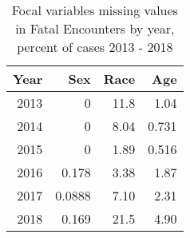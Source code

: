 \begin{table}[ht]
\centering
\begin{tabular}{rrrr}
  \hline
Year & Sex & Race & Age \\ 
  \hline
	 
	2013 & 0 &     11.8 & 1.04 \\ 
	2014 &0 &      8.04 &0.731 \\
	2015 &0    &   1.89 &0.516\\
	2016 &0.178 &  3.38 &1.87 \\
	2017 &0.0888 & 7.10 &2.31 \\
	2018 &0.169 & 21.5  &4.90 \\
   \hline
\end{tabular}
\caption{Focal variables missing values in Fatal Encounters by year, percent of cases 2013 - 2018} 
\label{tab:pct_var}
\end{table}
